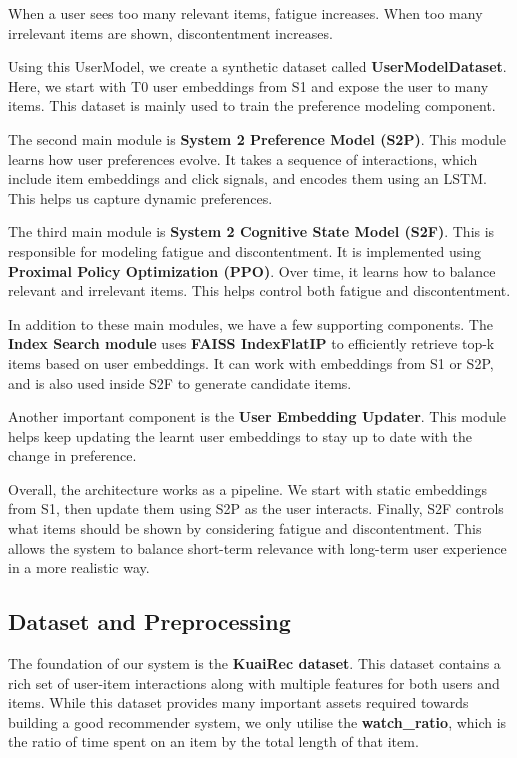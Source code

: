 When a user sees too many relevant items, fatigue increases. 
When too many irrelevant items are shown, discontentment increases.

Using this UserModel, we create a synthetic dataset called \textbf{UserModelDataset}. 
Here, we start with T0 user embeddings from S1 and expose the user to many items. 
This dataset is mainly used to train the preference modeling component.

The second main module is \textbf{System 2 Preference Model (S2P)}. 
This module learns how user preferences evolve. 
It takes a sequence of interactions, which include item embeddings and click signals, and encodes them using an LSTM.
This helps us capture dynamic preferences.

The third main module is \textbf{System 2 Cognitive State Model (S2F)}. 
This is responsible for modeling fatigue and discontentment. 
It is implemented using \textbf{Proximal Policy Optimization (PPO)}. 
Over time, it learns how to balance relevant and irrelevant items. 
This helps control both fatigue and discontentment.

In addition to these main modules, we have a few supporting components. 
The \textbf{Index Search module} uses \textbf{FAISS IndexFlatIP} to efficiently retrieve top-k items based on user embeddings. 
It can work with embeddings from S1 or S2P, and is also used inside S2F to generate candidate items.

Another important component is the \textbf{User Embedding Updater}. 
This module helps keep updating the learnt user embeddings to stay up to date with the change in preference.

Overall, the architecture works as a pipeline. 
We start with static embeddings from S1, then update them using S2P as the user interacts. 
Finally, S2F controls what items should be shown by considering fatigue and discontentment. 
This allows the system to balance short-term relevance with long-term user experience in a more realistic way.



\subsection{Dataset and Preprocessing}

The foundation of our system is the \textbf{KuaiRec dataset}. 
This dataset contains a rich set of user-item interactions along with multiple features for both users and items. 
While this dataset provides many important assets required towards building a good recommender system, 
we only utilise the \textbf{watch\_ratio}, which is the ratio of time spent on an item by the total length of that item.

